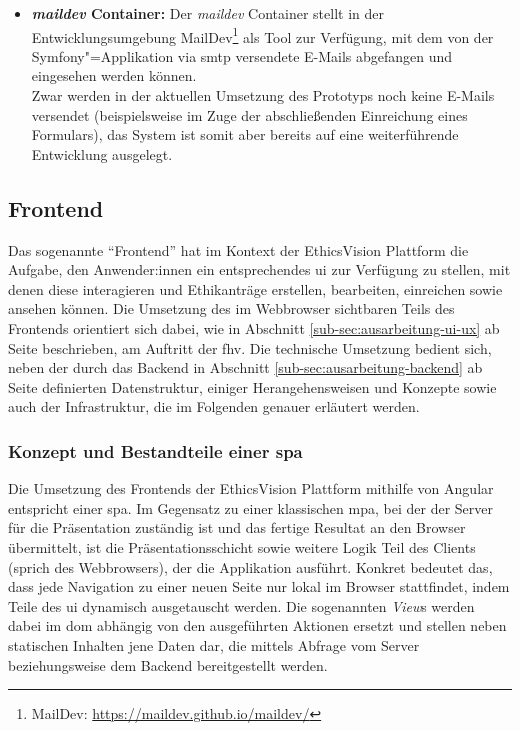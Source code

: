 \documentclass[a4paper,12pt,twoside]{scrreprt}
\begin{document}
\begin{itemize}
    \item \textbf{\textit{maildev} Container:} Der \textit{maildev} Container stellt in der Entwicklungsumgebung MailDev\footnote{MailDev: \url{https://maildev.github.io/maildev/}} als Tool zur Verfügung, mit dem von der Symfony"=Applikation via \ac{smtp} versendete E-Mails abgefangen und eingesehen werden können.\\
    Zwar werden in der aktuellen Umsetzung des Prototyps noch keine E-Mails versendet (beispielsweise im Zuge der abschließenden Einreichung eines Formulars), das System ist somit aber bereits auf eine weiterführende Entwicklung ausgelegt.
\end{itemize}

\subsection{Frontend}
\label{sub-sec:ausarbeitung-frontend}

Das sogenannte \enquote{Frontend} hat im Kontext der EthicsVision Plattform die Aufgabe, den Anwender:innen ein entsprechendes \acl{ui} zur Verfügung zu stellen, mit denen diese interagieren und Ethikanträge erstellen, bearbeiten, einreichen sowie ansehen können. Die Umsetzung des im Webbrowser sichtbaren Teils des Frontends orientiert sich dabei, wie in Abschnitt \ref{sub-sec:ausarbeitung-ui-ux} ab Seite \pageref{sub-sec:ausarbeitung-ui-ux} beschrieben, am Auftritt der \acl{fhv}. Die technische Umsetzung bedient sich, neben der durch das Backend in Abschnitt \ref{sub-sec:ausarbeitung-backend} ab Seite \pageref{sub-sec:ausarbeitung-backend} definierten Datenstruktur, einiger Herangehensweisen und Konzepte sowie auch der Infrastruktur, die im Folgenden genauer erläutert werden.

\subsubsection*{Konzept und Bestandteile einer \acl{spa}}
\label{sub-sub-sec:konzept-bestandteile-spa}

Die Umsetzung des Frontends der EthicsVision Plattform mithilfe von Angular entspricht einer \acl{spa}. Im Gegensatz zu einer klassischen \ac{mpa}, bei der der Server für die Präsentation zuständig ist und das fertige Resultat an den Browser übermittelt, ist die Präsentationsschicht sowie weitere Logik Teil des Clients (sprich des Webbrowsers), der die Applikation ausführt. Konkret bedeutet das, dass jede Navigation zu einer neuen Seite nur lokal im Browser stattfindet, indem Teile des \ac{ui} dynamisch ausgetauscht werden. Die sogenannten \textit{View}s werden dabei im \ac{dom} abhängig von den ausgeführten Aktionen ersetzt und stellen neben statischen Inhalten jene Daten dar, die mittels Abfrage vom Server beziehungsweise dem Backend bereitgestellt werden. \cite[5\psqq]{scott_spa_2015}
\end{document}
